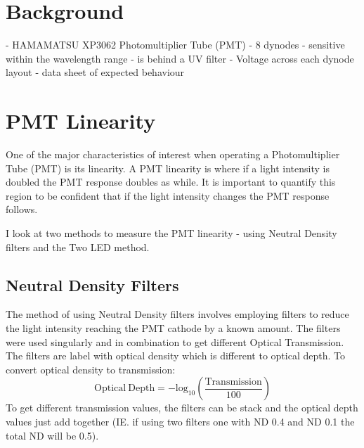 
\section{Background}

- HAMAMATSU XP3062 Photomultiplier Tube (PMT)
- 8 dynodes
- sensitive within the wavelength range
- is behind a UV filter
- Voltage across each dynode layout
- data sheet of expected behaviour

\section{PMT Linearity}

One of the major characteristics of interest when operating a Photomultiplier Tube (PMT) is its linearity. A PMT linearity is where if a light intensity is doubled the PMT response doubles as while. It is important to quantify this region to be confident that if the light intensity changes the PMT response follows.

I look at two methods to measure the PMT linearity - using Neutral Density filters and the Two LED method.

\subsection{Neutral Density Filters}

The method of using Neutral Density filters involves employing filters to reduce the light intensity reaching the PMT cathode by a known amount. The filters were used singularly and in combination to get different Optical Transmission. The filters are label with optical density which is different to optical depth. To convert optical density to transmission:
\begin{equation}
\mathrm{Optical \ Depth} = - \mathrm{log}_{10}\left(\frac{\mathrm{Transmission}}{100} \right)
\end{equation}
To get different transmission values, the filters can be stack and the optical depth values just add together (IE. if using two filters one with ND 0.4 and ND 0.1 the total ND will be 0.5).

